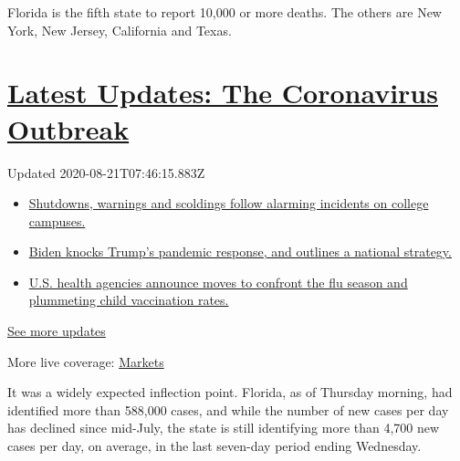Florida is the fifth state to report 10,000 or more deaths. The others
are New York, New Jersey, California and Texas.

\hypertarget{latest-updates-the-coronavirus-outbreak}{%
\section{\texorpdfstring{\href{https://www.nytimes3xbfgragh.onion/2020/08/20/world/coronavirus-covid.html?action=click\&pgtype=Article\&state=default\&region=MAIN_CONTENT_1\&context=storylines_live_updates}{Latest
Updates: The Coronavirus
Outbreak}}{Latest Updates: The Coronavirus Outbreak}}\label{latest-updates-the-coronavirus-outbreak}}

Updated 2020-08-21T07:46:15.883Z

\begin{itemize}
\tightlist
\item
  \href{https://www.nytimes3xbfgragh.onion/2020/08/20/world/coronavirus-covid.html?action=click\&pgtype=Article\&state=default\&region=MAIN_CONTENT_1\&context=storylines_live_updates\#link-68774d88}{Shutdowns,
  warnings and scoldings follow alarming incidents on college campuses.}
\item
  \href{https://www.nytimes3xbfgragh.onion/2020/08/20/world/coronavirus-covid.html?action=click\&pgtype=Article\&state=default\&region=MAIN_CONTENT_1\&context=storylines_live_updates\#link-26b58724}{Biden
  knocks Trump's pandemic response, and outlines a national strategy.}
\item
  \href{https://www.nytimes3xbfgragh.onion/2020/08/20/world/coronavirus-covid.html?action=click\&pgtype=Article\&state=default\&region=MAIN_CONTENT_1\&context=storylines_live_updates\#link-4e542da3}{U.S.
  health agencies announce moves to confront the flu season and
  plummeting child vaccination rates.}
\end{itemize}

\href{https://www.nytimes3xbfgragh.onion/2020/08/20/world/coronavirus-covid.html?action=click\&pgtype=Article\&state=default\&region=MAIN_CONTENT_1\&context=storylines_live_updates}{See
more updates}

More live coverage:
\href{https://www.nytimes3xbfgragh.onion/live/2020/08/20/business/stock-market-today-coronavirus?action=click\&pgtype=Article\&state=default\&region=MAIN_CONTENT_1\&context=storylines_live_updates}{Markets}

It was a widely expected inflection point. Florida, as of Thursday
morning, had identified more than 588,000 cases, and while the number of
new cases per day has declined since mid-July, the state is still
identifying more than 4,700 new cases per day, on average, in the last
seven-day period ending Wednesday.

